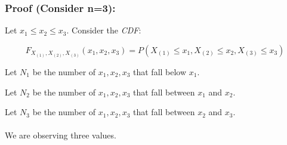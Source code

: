 \documentclass{article}
\begin{document}
\subsubsection*{Proof (Consider n=3):}

Let $x_1 \leq x_2 \leq x_3$. Consider the \textit{CDF}:

\begin{equation*}
    F_{X_{(1)},X_{(2)},X_{(3)}}(x_1,x_2,x_3) = P(X_{(1)} \leq x_1, X_{(2)} \leq x_2, X_{(3)} \leq x_3)
\end{equation*}

    Let $N_1$ be the number of $x_1,x_2,x_3$ that fall below $x_1$.
    
    Let $N_2$ be the number of $x_1,x_2,x_3$ that fall between $x_1$ and $x_2$.
    
    Let $N_3$ be the number of $x_1,x_2,x_3$ that fall between $x_2$ and $x_3$.
\\~\\
We are observing three values. 
\end{document}
